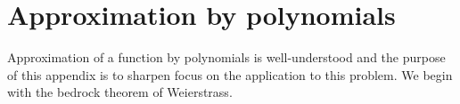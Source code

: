 \chapter{Approximation by polynomials}

Approximation of a function by polynomials is well-understood and the purpose of this appendix is to sharpen focus on the application to this problem. We begin with the bedrock theorem of Weierstrass.




%


\endinput %